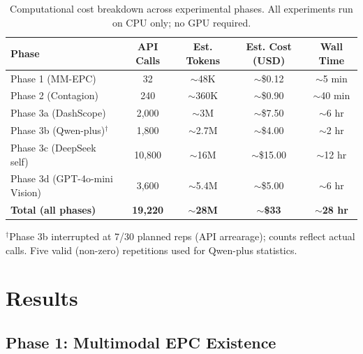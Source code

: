 \documentclass[11pt,a4paper]{article}
\begin{document}
\begin{table}[H]
\centering
\caption{Computational cost breakdown across experimental phases. All experiments run on CPU only; no GPU required.}
\label{tab:cost}
\begin{tabular}{lcccc}
\toprule
\textbf{Phase} & \textbf{API Calls} & \textbf{Est. Tokens} & \textbf{Est. Cost (USD)} & \textbf{Wall Time} \\
\midrule
Phase 1 (MM-EPC)        & 32    & $\sim$48K   & $\sim$\$0.12  & $\sim$5 min \\
Phase 2 (Contagion)     & 240   & $\sim$360K  & $\sim$\$0.90  & $\sim$40 min \\
Phase 3a (DashScope)    & 2,000 & $\sim$3M    & $\sim$\$7.50  & $\sim$6 hr \\
Phase 3b (Qwen-plus)$^\dagger$ & 1,800 & $\sim$2.7M & $\sim$\$4.00 & $\sim$2 hr \\
Phase 3c (DeepSeek self) & 10,800 & $\sim$16M  & $\sim$\$15.00 & $\sim$12 hr \\
Phase 3d (GPT-4o-mini Vision) & 3,600 & $\sim$5.4M & $\sim$\$5.00 & $\sim$6 hr \\
\midrule
\textbf{Total (all phases)} & \textbf{19,220} & $\sim$\textbf{28M} & $\sim$\textbf{\$33} & $\sim$\textbf{28 hr} \\
\bottomrule
\end{tabular}

\vspace{4pt}
\begin{minipage}{\textwidth}
\footnotesize
$^\dagger$Phase 3b interrupted at 7/30 planned reps (API arrearage); counts reflect actual calls. Five valid (non-zero) repetitions used for Qwen-plus statistics.
\end{minipage}
\end{table}

\section{Results}

\subsection{Phase 1: Multimodal EPC Existence}
\end{document}
